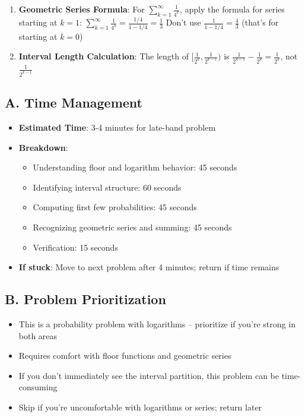 \documentclass[11pt]{article}
\begin{document}
\begin{solutionbox}
\begin{enumerate}
    \item \textbf{Geometric Series Formula}: For $\sum_{k=1}^{\infty} \frac{1}{4^k}$, apply the formula for series starting at $k=1$:
    $\sum_{k=1}^{\infty} \frac{1}{4^k} = \frac{1/4}{1-1/4} = \frac{1}{3}$
    Don't use $\frac{1}{1-1/4} = \frac{4}{3}$ (that's for starting at $k=0$)
    
    \item \textbf{Interval Length Calculation}: The length of $[\frac{1}{2^k}, \frac{1}{2^{k-1}})$ is $\frac{1}{2^{k-1}} - \frac{1}{2^k} = \frac{1}{2^k}$, not $\frac{1}{2^{k-1}}$
\end{enumerate}
\end{solutionbox}

\begin{competitionbox}
\subsection*{A. Time Management}
\begin{itemize}[leftmargin=*]
    \item \textbf{Estimated Time}: 3-4 minutes for late-band problem
    \item \textbf{Breakdown}:
    \begin{itemize}
        \item Understanding floor and logarithm behavior: 45 seconds
        \item Identifying interval structure: 60 seconds
        \item Computing first few probabilities: 45 seconds
        \item Recognizing geometric series and summing: 45 seconds
        \item Verification: 15 seconds
    \end{itemize}
    \item \textbf{If stuck}: Move to next problem after 4 minutes; return if time remains
\end{itemize}

\subsection*{B. Problem Prioritization}
\begin{itemize}[leftmargin=*]
    \item This is a probability problem with logarithms -- prioritize if you're strong in both areas
    \item Requires comfort with floor functions and geometric series
    \item If you don't immediately see the interval partition, this problem can be time-consuming
    \item Skip if you're uncomfortable with logarithms or series; return later
\end{itemize}


\end{competitionbox}
\end{document}
